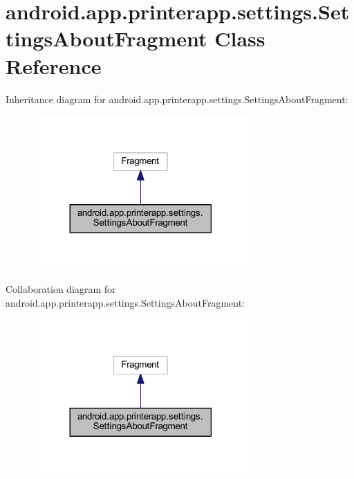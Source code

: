 \hypertarget{classandroid_1_1app_1_1printerapp_1_1settings_1_1_settings_about_fragment}{}\section{android.\+app.\+printerapp.\+settings.\+Settings\+About\+Fragment Class Reference}
\label{classandroid_1_1app_1_1printerapp_1_1settings_1_1_settings_about_fragment}


Inheritance diagram for android.\+app.\+printerapp.\+settings.\+Settings\+About\+Fragment\+:
\nopagebreak
\begin{figure}[H]
\begin{center}
\leavevmode
\includegraphics[width=233pt]{classandroid_1_1app_1_1printerapp_1_1settings_1_1_settings_about_fragment__inherit__graph}
\end{center}
\end{figure}


Collaboration diagram for android.\+app.\+printerapp.\+settings.\+Settings\+About\+Fragment\+:
\nopagebreak
\begin{figure}[H]
\begin{center}
\leavevmode
\includegraphics[width=233pt]{classandroid_1_1app_1_1printerapp_1_1settings_1_1_settings_about_fragment__coll__graph}
\end{center}
\end{figure}
